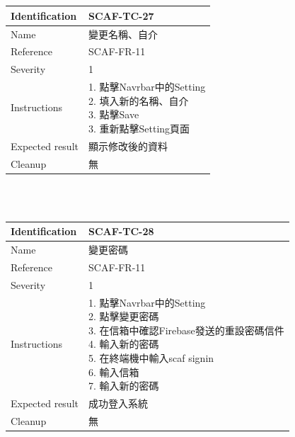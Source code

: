 \documentclass{report}
\begin{document}
\\
\newline
\\
\begin{tabularx}{\textwidth}{
  |p{}%
  |p{}|%
  }
  \hline
  \centering Identification &  SCAF-TC-27 \\
  \hline
  \centering Name & 變更名稱、自介 \\
  \hline
  \centering Reference & SCAF-FR-11 \\
  \hline
  \centering Severity & 1 \\
  \hline
  \centering Instructions & 
  \makecell[l]{
    1. 點擊Navrbar中的Setting \\
    2. 填入新的名稱、自介 \\
    3. 點擊Save \\
    3. 重新點擊Setting頁面
  }\\
  \hline
  \centering Expected result & 顯示修改後的資料 \\
  \hline
  \centering Cleanup & 無 \\
  \hline
\end{tabularx}
\\
\newline
\\
\begin{tabularx}{\textwidth}{
  |p{}%
  |p{}|%
  }
  \hline
  \centering Identification &  SCAF-TC-28 \\
  \hline
  \centering Name & 變更密碼 \\
  \hline
  \centering Reference & SCAF-FR-11 \\
  \hline
  \centering Severity & 1 \\
  \hline
  \centering Instructions & 
  \makecell[l]{
    1. 點擊Navrbar中的Setting \\
    2. 點擊變更密碼 \\
    3. 在信箱中確認Firebase發送的重設密碼信件 \\
    4. 輸入新的密碼 \\
    5. 在終端機中輸入scaf signin\\
    6. 輸入信箱 \\
    7. 輸入新的密碼 \\
  }\\
  \hline
  \centering Expected result & 成功登入系統 \\
  \hline
  \centering Cleanup & 無 \\
  \hline
\end{tabularx}
\end{document}
